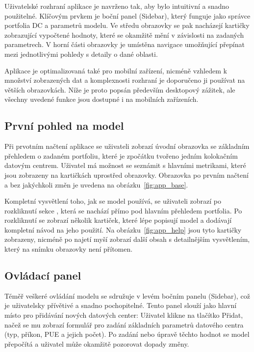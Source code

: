 Uživatelské rozhraní aplikace je navrženo tak, aby bylo intuitivní a snadno použitelné. Klíčovým prvkem je boční panel (Sidebar), který funguje jako správce portfolia DC a parametrů modelu. Ve středu obrazovky se pak nacházejí kartičky zobrazující vypočtené hodnoty, které se okamžitě mění v závislosti na zadaných parametrech. V horní části obrazovky je umístěna navigace umožňující přepínat mezi jednotlivými pohledy s detaily o dané oblasti.

Aplikace je optimalizovaná také pro mobilní zařízení, nicméně vzhledem k množství zobrazených dat a komplexnosti rozhraní je doporučeno ji používat na větších obrazovkách. Níže je proto popsán především desktopový zážitek, ale všechny uvedené funkce jsou dostupné i na mobilních zařízeních.

\subsection{První pohled na model}
\label{subsec:app_ui_uvod}

Při prvotním načtení aplikace se uživateli zobrazí úvodní obrazovka se základním přehledem o zadaném portfoliu, které je zpočátku tvořeno jedním kolokačním datovým centrem. Uživatel má možnost se seznámit s hlavními metrikami, které jsou zobrazeny na kartičkách uprostřed obrazovky. Obrazovka po prvním načtení a bez jakýchkoli změn je uvedena na obrázku~\ref{fig:app_base}.

Kompletní vysvětlení toho, jak se model používá, se uživateli zobrazí po rozkliknutí sekce , která se nachází přímo pod hlavním přehledem portfolia. Po rozkliknutí se zobrazí několik kartiček, které lépe popisují model a dodávají kompletní návod na jeho použití. Na obrázku~\ref{fig:app_help} jsou tyto kartičky zobrazeny, nicméně po najetí myší zobrazí další obsah s detailnějším vysvětlením, který na snímku obrazovky není přítomen. 

\subsection{Ovládací panel}
\label{subsec:app_ui_panel}

Téměř veškeré ovládání modelu se sdružuje v levém bočním panelu (Sidebar), což je uživatelsky přívětivé a snadno pochopitelné. Tento panel slouží jako hlavní místo pro přidávání nových datových center: Uživatel klikne na tlačítko Přidat, načež se mu zobrazí formulář pro zadání základních parametrů datového centra (typ, příkon, PUE a jejich počet). Po zadání nebo úpravě těchto hodnot se model přepočítá a uživatel může okamžitě pozorovat dopady změny.

